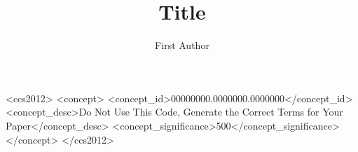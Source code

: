 \documentclass[sigconf, anonymous, review]{acmart}
\begin{document}
\title{Title}

\author{First Author}
\correspondingauthor
{}

\renewcommand{\shortauthors}{Author et al.}

\begin{abstract}

\end{abstract}

\begin{CCSXML}
<ccs2012>
 <concept>
  <concept_id>00000000.0000000.0000000</concept_id>
  <concept_desc>Do Not Use This Code, Generate the Correct Terms for Your Paper</concept_desc>
  <concept_significance>500</concept_significance>
 </concept>
</ccs2012>
\end{CCSXML}



\maketitle













\appendix


\end{document}
